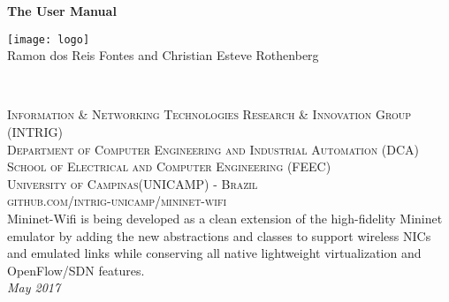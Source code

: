 \documentclass[11pt,fleqn]{book} %
\begin{document}
\begingroup
\thispagestyle{empty}


\vspace*{1cm}
\centering
\par\normalfont\fontsize{35}{35}\sffamily\selectfont
\centering
\textbf{The User Manual}\\
{\LARGE }\par %
\vspace*{4cm}
\centering
\texttt{[image: logo]} %
\\
\vspace*{3cm}
{\large Ramon dos Reis Fontes and Christian Esteve Rothenberg }\par %
\endgroup


\newpage
~\vfill
\thispagestyle{empty}


\noindent \textsc{Information \& Networking Technologies Research \& Innovation Group  (INTRIG)} \\
\noindent \textsc{Department of Computer Engineering and Industrial Automation (DCA)}\\
\noindent \textsc{School of Electrical and Computer Engineering (FEEC)}\\
\noindent \textsc{University of Campinas(UNICAMP) - Brazil}\\

\noindent \textsc{github.com/intrig-unicamp/mininet-wifi}\\ %

\noindent Mininet-Wifi is being developed as a clean extension of the  high-fidelity Mininet emulator by adding the new abstractions and classes to support wireless NICs and emulated links while conserving all native lightweight virtualization and OpenFlow/SDN features.\\ %

\noindent \textit{May 2017} %

\end{document}
